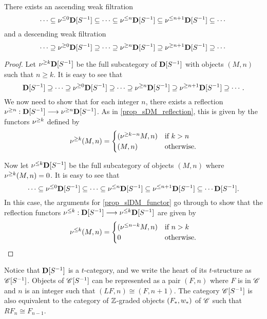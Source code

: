 \begin{thm}\label{thm_summary_dloc}
There exists an ascending weak filtration
\[
\cdots \subseteq \nu^{\leq 0}\mathbf{D}[S^{-1}] \subseteq \cdots \subseteq 
   \nu^{\leq n}\mathbf{D}[S^{-1}] \subseteq \nu^{\leq n + 1}\mathbf{D}[S^{-1}] 
   \subseteq \cdots
\]
and a descending weak filtration
\[
\cdots \supseteq \nu^{\geq 0}\mathbf{D}[S^{-1}] \supseteq \cdots \supseteq 
   \nu^{\geq n}\mathbf{D}[S^{-1}] \supseteq \nu^{\geq n + 1}\mathbf{D}[S^{-1}] 
   \supseteq \cdots
\]
\end{thm}
\begin{proof}
Let $\nu^{\geq k}\mathbf{D}[S^{-1}]$ be the full subcategory of 
$\mathbf{D}[S^{-1}]$ with objects $(M, n)$ such that $n \geq k$. It is
easy to see that
\[
\mathbf{D}[S^{-1}] \supseteq \cdots \supseteq \nu^{\geq 0}\mathbf{D}[S^{-1}] 
   \supseteq \cdots \supseteq \nu^{\geq n}\mathbf{D}[S^{-1}] \supseteq 
   \nu^{\geq n + 1}\mathbf{D}[S^{-1}] \supseteq \cdots.
\]
We now need to show that for each integer $n$, there exists a 
reflection $\nu^{\geq n}: \mathbf{D}[S^{-1}] \longrightarrow \nu^{\geq n}\mathbf{D}[S^{-1}]$.
As in \ref{prop_sDM_reflection}, this is given by the
functors $\nu^{\geq k}$ defined by
\[
\nu^{\geq k}(M, n) = \begin{cases}
(\nu^{\geq k - n}M, n) &\textrm{if }k > n\\
(M, n) &\textrm{otherwise}.
\end{cases}
\]

Now let $\nu^{\leq k}\mathbf{D}[S^{-1}]$ be the full subcategory of
objects $(M, n)$ where $\nu^{\geq k}(M, n) = 0$. It is easy to
see that
\[
\cdots \subseteq \nu^{\leq 0}\mathbf{D}[S^{-1}] \subseteq \cdots \subseteq 
   \nu^{\leq n}\mathbf{D}[S^{-1}] \subseteq \nu^{\leq n + 1}\mathbf{D}[S^{-1}] 
   \subseteq \cdots \mathbf{D}[S^{-1}].
\]
In this case, the arguments for \ref{prop_slDM_functor} go through 
to show that the reflection functors $\nu^{\leq k} : \mathbf{D}[S^{-1}]
\longrightarrow \nu^{\leq k} \mathbf{D}[S^{-1}]$ are given by
\[
\nu^{\leq k}(M, n) = \begin{cases}
(\nu^{\leq n - k}M, n) &\textrm{if }n > k\\
0                    &\textrm{otherwise}.
\end{cases}
\]
\end{proof}

Notice that $\mathbf{D}[S^{-1}]$ is a $t$-category, and we write the
heart of its $t$-structure as $\mathscr{C}[{S}^{-1}]$. Objects of 
$\mathscr{C}[{S}^{-1}]$ can be represented as a pair $(F, n)$ where
$F$ is in $\mathscr{C}$ and $n$ is an integer such that $(LF, n) 
\cong (F, n + 1)$. The category $\mathscr{C}[{S}^{-1}]$ is also equivalent
to the category of $\mathbb{Z}$-graded objects $(F_*, w_*)$ of 
$\mathscr{C}$ such that $RF_n \cong F_{n - 1}$.

